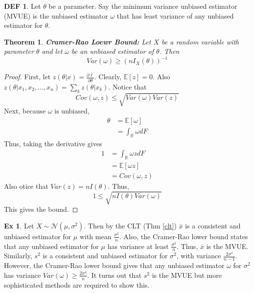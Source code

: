 \documentclass{article}
\newtheorem{theorem}{Theorem}
\theoremstyle{definition}\newtheorem{definition}{DEF}
\theoremstyle{definition}\newtheorem{example}{Ex}
\theoremstyle{lemma}\newtheorem{lemma}{Lemma}
\theoremstyle{corrolary}\newtheorem{corrolary}{Cor}
\begin{document}
\begin{definition}\label{mvue}
Let $\theta$ be a parameter.
Say the minimum variance unbiased estimator (MVUE) is the unbiased estimator $\omega$ that has least variance of any unbiased estimator for $\theta$.
\end{definition}

\begin{theorem}
\textbf{Cramer-Rao Loewr Bound:}
Let $X$ be a random variable with parameter $\theta$ and let $\omega$ be an unbiased estimator of $\theta$.
Then
\begin{equation}
Var(\omega) \geq (nI_X(\theta))^{-1}
\end{equation}
\end{theorem}
\begin{proof}
First, let $z(\theta | x) = \frac{\partial \ell}{\partial \theta}$.
Clearly, $\mathbb{E}[z]=0$.
Also $z(\theta | x_1, x_2, ..., x_n)=\sum_k z(\theta|x_k)$.
Notice that 
\begin{equation*}
Cov(\omega, z) \leq \sqrt{Var(\omega)Var(z)}
\end{equation*}
Next, because $\omega$ is unbiased,
\begin{align*}
\theta
&= \mathbb{E}[\omega] \\
&= \int_\mathbb{R} \omega dF
\end{align*}
Thus, taking the derivative gives
\begin{align*}
1 
&= \int_\mathbb{R} \omega z dF \\
&= \mathbb{E}[\omega z] \\
&= Cov(\omega, z)
\end{align*}
Also otice that $Var(z)=nI(\theta)$.
Thus,
\begin{equation*}
1 \leq \sqrt{nI(\theta)Var(\omega)}
\end{equation*}
This gives the bound.
\end{proof}

\begin{example}
Let $X\sim \mathcal{N}(\mu, \sigma^2)$.
Then by the CLT (Thm \ref{clt}) $\bar{x}$ is a consistent and unbiased estimator for $\mu$ with mean $\frac{\sigma^2}{n}$.
Also, the Cramer-Rao lower bound states that any unbiased estimator for $\mu$ has variance at least $\frac{\sigma^2}{n}$.
Thus, $\bar{x}$ is the MVUE.
Similarly, $s^2$ is a consistent and unbiased estimator for $\sigma^2$, with variance $\frac{2\sigma^4}{n-1}$.
However, the Cramer-Rao lower bound gives that any unbiased estimator $\omega$ for $\sigma^2$ has variance $Var(\omega)\geq \frac{2\sigma^4}{n}$.
It turns out that $s^2$ is the MVUE but more sophisticated methods are required to show this.
\end{example}
\end{document}
